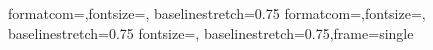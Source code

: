 

{formatcom={\color{Sinput}},fontsize=\footnotesize, baselinestretch=0.75}
{formatcom={\color{Soutput}},fontsize=\footnotesize, baselinestretch=0.75}
{fontsize=\footnotesize, baselinestretch=0.75,frame=single}
\renewenvironment{Schunk}{\vspace{\topsep}}{\vspace{\topsep}}